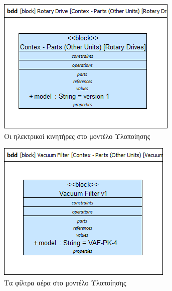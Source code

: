\documentclass[a4paper,12pt,twoside]{report}
\begin{document}
\begin{appendices}
				\begin{figure}[hp]
					\centering
					\includegraphics[scale=0.50]{DesignModel_Contex-Parts(OtherUnits)[RotaryDrives].png}
					\caption{Οι ηλεκτρικοί κινητήρες στο μοντέλο Υλοποίησης}
					\label{φωτ:Οι ηλεκτρικοί κινητήρες στο μοντέλο Υλοποίησης}
				\end{figure}
				
				\begin{figure}[hp]
					\centering
					\includegraphics[scale=0.50]{DesignModel_Contex-Parts(OtherUnits)[VacuumFilter].png}
					\caption{Τα φίλτρα αέρα στο μοντέλο Υλοποίησης}
					\label{φωτ:Τα φίλτρα αέρα στο μοντέλο Υλοποίησης}
				\end{figure}
				

\end{appendices}
\end{document}
